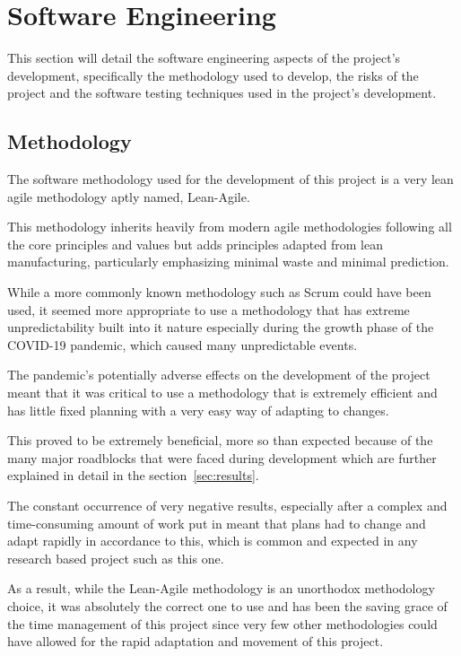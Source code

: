 \documentclass[12pt]{article}
\newcommand{\sentence}{} %
\renewcommand{\fullref}[1]{\ref{#1}\nameref{#1}}
\begin{document}
    \pagebreak


    \section{Software Engineering}\label{sec:software-engineering}

    \tab
    This section will detail the software engineering aspects of the project's development, specifically the
    methodology used to develop, the risks of the project and the software testing techniques used in the project's
    development.

    \subsection{Methodology}\label{subsec:methodology}

    \tab
    The software methodology used for the development of this project is a very lean agile methodology aptly named,
    Lean-Agile.
    \sentence
    This methodology inherits heavily from modern agile methodologies following all the core principles and values
    but adds principles adapted from lean manufacturing, particularly emphasizing minimal waste and minimal
    prediction.
    \sentence
    While a more commonly known methodology such as Scrum could have been used, it seemed more appropriate to use a
    methodology that has extreme unpredictability built into it nature especially during the growth phase of the
    COVID-19 pandemic, which caused many unpredictable events.
    \sentence
    The pandemic's potentially adverse effects on the development of the project meant that it was critical to use a
    methodology that is extremely efficient and has little fixed planning with a very easy way of adapting to changes.
    \sentence
    This proved to be extremely beneficial, more so than expected because of the many major roadblocks that were
    faced during development which are further explained in detail in the section~\fullref{sec:results}.
    \sentence
    The constant occurrence of very negative results, especially after a complex and time-consuming amount of work
    put in meant that plans had to change and adapt rapidly in accordance to this, which is common and expected in
    any research based project such as this one.
    \sentence
    As a result, while the Lean-Agile methodology is an unorthodox methodology choice, it was absolutely the correct
    one to use and has been the saving grace of the time management of this project since very few other
    methodologies could have allowed for the rapid adaptation and movement of this project.
\end{document}
